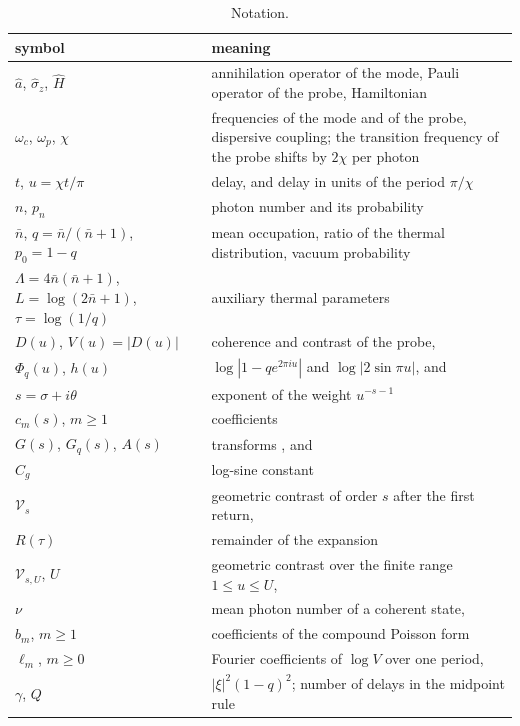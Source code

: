 \documentclass[11pt,reqno]{amsart}
\makeatletter
\let\CG@origeqref\eqref
\newcommand{\CG@gettip}[1]{\@ifundefined{CGTip@#1}{Reference: #1}{\csname CGTip@#1\endcsname}}
\DeclareRobustCommand{\CGeqref}[1]{\pdftooltip{\CG@origeqref{#1}}{\CG@gettip{#1}}}
\numberwithin{equation}{section}
\theoremstyle{plain}
\theoremstyle{definition}
\theoremstyle{remark}
\makeatother
\begin{document}
\begin{table}[!htb]
\caption{Notation.}\label{tab:notation}
\small
\begin{tabular}{p{}p{}}
\toprule
symbol & meaning\\
\midrule
$\hat a$, $\hat\sigma_z$, $\hat H$ & annihilation operator of the mode, Pauli operator of the probe, Hamiltonian \CGeqref{eq:H}\\
$\omega_c$, $\omega_p$, $\chi$ & frequencies of the mode and of the probe, dispersive coupling; the transition frequency of the probe shifts by $2\chi$ per photon\\
$t$, $u=\chi t/\pi$ & delay, and delay in units of the period $\pi/\chi$\\
$n$, $p_n$ & photon number and its probability \CGeqref{eq:pn}\\
$\bar n$, $q=\bar n/(\bar n+1)$, $p_0=1-q$ & mean occupation, ratio of the thermal distribution, vacuum probability\\
$\Lambda=4\bar n(\bar n+1)$, $L=\log(2\bar n+1)$, $\tau=\log(1/q)$ & auxiliary thermal parameters\\
$D(u)$, $V(u)=|D(u)|$ & coherence and contrast of the probe, \CGeqref{eq:D}\\
$\Phi_q(u)$, $h(u)$ & $\log|1-qe^{2\pi iu}|$ and $\log|2\sin\pi u|$, \CGeqref{eq:logV} and \CGeqref{eq:G}\\
$s=\sigma+i\theta$ & exponent of the weight $u^{-s-1}$\\
$c_m(s)$, $m\ge1$ & coefficients \CGeqref{eq:cm}\\
$G(s)$, $G_q(s)$, $A(s)$ & transforms \CGeqref{eq:G}, \CGeqref{eq:Gq} and \CGeqref{eq:A}\\
$C_g$ & log-sine constant \CGeqref{eq:Cg}\\
$\mathcal V_s$ & geometric contrast of order $s$ after the first return, \CGeqref{eq:Vs}\\
$R(\tau)$ & remainder of the expansion \CGeqref{eq:hot}\\
$\mathcal V_{s,U}$, $U$ & geometric contrast over the finite range $1\le u\le U$, \CGeqref{eq:VsU}\\
$\nu$ & mean photon number of a coherent state, \CGeqref{eq:coh}\\
$b_m$, $m\ge1$ & coefficients of the compound Poisson form \CGeqref{eq:cp}\\
$\ell_m$, $m\ge0$ & Fourier coefficients of $\log V$ over one period, \CGeqref{eq:ellm}\\
$\gamma$, $Q$ & $|\xi|^2(1-q)^2$; number of delays in the midpoint rule\\

\end{tabular}
\end{table}
\end{document}
